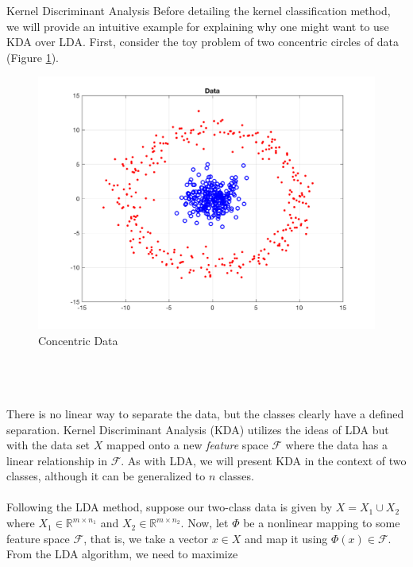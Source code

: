 \begin{section}{Kernel Discriminant Analysis}
Before detailing the kernel classification method, we will provide an intuitive example for explaining why one might want to use KDA over LDA. First, consider the toy problem of two concentric circles of data (Figure \ref{fig:circle_data}).

\begin{minipage}{1.0\textwidth}
    \begin{figure}[H]
    \centering
    \includegraphics[trim={0cm 0cm 0cm 0cm},clip,width=0.8\columnwidth]{kda_test/circles_data}
    \caption{Concentric Data}
    \label{fig:circle_data}
    \end{figure}
\end{minipage}
\\
\\
\\
There is no linear way to separate the data, but the classes clearly have a defined separation. Kernel Discriminant Analysis (KDA) utilizes the ideas of LDA but with the data set $X$ mapped onto a new \textit{feature} space $\mathcal{F}$ where the data has a linear relationship in $\mathcal{F}$. As with LDA, we will present KDA in the context of two classes, although it can be generalized to $n$ classes.
\\
\\
Following the LDA method, suppose our two-class data is given by $X = X_1 \cup X_2$ where $X_1 \in \mathbb{R}^{m \times n_1}$ and $X_2 \in \mathbb{R}^{m \times n_2}$. Now, let $\Phi$ be a nonlinear mapping to some feature space $\mathcal{F}$, that is, we take a vector $x \in X$ and map it using $\Phi(x) \in \mathcal{F}$. From the LDA algorithm, we need to maximize

\end{section}
